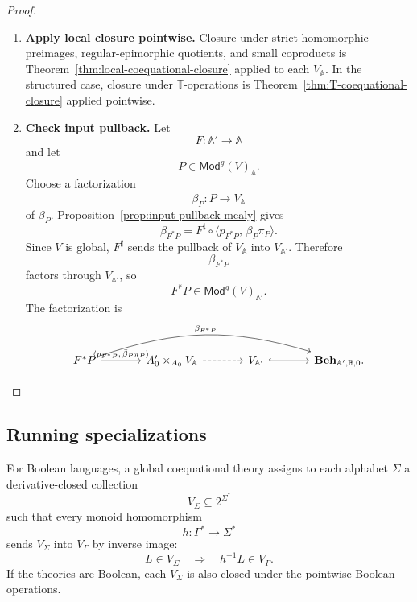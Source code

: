 \begin{proof}
    \leavevmode
    \begin{enumerate}
        \item \textbf{Apply local closure pointwise.}
        Closure under strict homomorphic preimages, regular-epimorphic
        quotients, and small coproducts is
        Theorem~\ref{thm:local-coequational-closure} applied to each
        \(V_{\mathbb A}\). In the structured case, closure under
        \(\mathbb T\)-operations is Theorem~\ref{thm:T-coequational-closure}
        applied pointwise.

        \item \textbf{Check input pullback.}
        Let
        \[
            F:\mathbb A'\to\mathbb A
        \]
        and let
        \[
            P\in\mathsf{Mod}^{g}(V)_{\mathbb A}.
        \]
        Choose a factorization
        \[
            \bar\beta_P:P\to V_{\mathbb A}
        \]
        of \(\beta_P\). Proposition~\ref{prop:input-pullback-mealy}
        gives
        \[
            \beta_{F^*P}
            =
            F^\sharp
            \circ
            \langle p_{F^*P},\,\beta_P\pi_P\rangle.
        \]
        Since \(V\) is global, \(F^\sharp\) sends the pullback of
        \(V_{\mathbb A}\) into \(V_{\mathbb A'}\). Therefore
        \[
            \beta_{F^*P}
        \]
        factors through \(V_{\mathbb A'}\), so
        \[
            F^*P\in\mathsf{Mod}^{g}(V)_{\mathbb A'}.
        \]
        The factorization is
        \[
        \begin{tikzcd}[column sep=large, row sep=large]
            F^*P
                \arrow[r, "{\langle p_{F^*P},\,\bar\beta_P\pi_P\rangle}"]
                \arrow[rrr, bend left=18, "\beta_{F^*P}"]
            &
            A'_0\times_{A_0}V_{\mathbb A}
                \arrow[r, dashed]
            &
            V_{\mathbb A'}
                \arrow[r, hook]
            &
            \mathbf{Beh}_{\mathbb A',\mathbb B,0}.
        \end{tikzcd}
        \]
    \end{enumerate}
\end{proof}

\subsection{Running specializations}
\label{subsec:global-theories-running-specializations}

For Boolean languages, a global coequational theory assigns to each alphabet
\(\Sigma\) a derivative-closed collection
\[
    V_\Sigma\subseteq 2^{\Sigma^*}
\]
such that every monoid homomorphism
\[
    h:\Gamma^*\to\Sigma^*
\]
sends \(V_\Sigma\) into \(V_\Gamma\) by inverse image:
\[
    L\in V_\Sigma
    \quad\Longrightarrow\quad
    h^{-1}L\in V_\Gamma.
\]
If the theories are Boolean, each \(V_\Sigma\) is also closed under the
pointwise Boolean operations.

